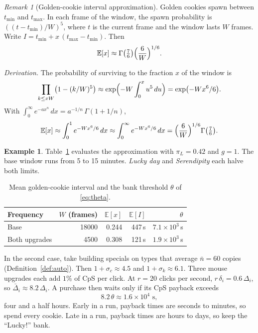 \documentclass[11pt,a4paper]{article}
\numberwithin{equation}{section}
\theoremstyle{definition}
\newtheorem{example}[theorem]{Example}
\theoremstyle{remark}
\newtheorem{remark}[theorem]{Remark}
\newcommand{\E}{\mathbb E}
\newcommand{\Lucky}{\textup{``Lucky!''}}
\begin{document}
\begin{remark}[Golden-cookie interval approximation]\label{lem:interval}
Golden cookies spawn between $t_{\min}$ and $t_{\max}$. In each frame of the window, the spawn probability is $((t-t_{\min})/W)^5$, where $t$ is the current frame and the window lasts $W$ frames. Write $I=t_{\min}+x\,(t_{\max}-t_{\min})$. Then
\begin{equation}\label{eq:interval}
 \E[x]\approx\Gamma\bigl(\tfrac76\bigr)\Bigl(\frac6W\Bigr)^{1/6}.
\end{equation}
\end{remark}

\noindent\emph{Derivation.}
The probability of surviving to the fraction $x$ of the window is
\[
 \prod_{k\le xW}\bigl(1-(k/W)^5\bigr)\approx\exp\Bigl(-W\int_0^xu^5\,du\Bigr)=\exp\bigl(-Wx^6/6\bigr).
\]
With $\int_0^\infty e^{-ax^n}\,dx=a^{-1/n}\,\Gamma(1+1/n)$,
\[
 \E[x]\approx\int_0^1e^{-Wx^6/6}\,dx\approx\int_0^\infty e^{-Wx^6/6}\,dx=\Bigl(\frac6W\Bigr)^{1/6}\Gamma\bigl(\tfrac76\bigr).
\]


\begin{example}\label{ex:theta}
Table~\ref{tab:interval} evaluates the approximation with $\pi_L=0.42$ and $g=1$. The base window runs from 5 to 15 minutes. \emph{Lucky day} and \emph{Serendipity} each halve both limits.

\begin{table}[H]
\centering
\small
\begin{tabular}{@{}lrrrr@{}}
\toprule
Frequency & $W$ (frames) & $\E[x]$ & $\E[I]$ & $\theta$ \\
\midrule
Base & 18000 & 0.244 & 447\,s & $7.1\times10^3$\,s \\
Both upgrades & 4500 & 0.308 & 121\,s & $1.9\times10^3$\,s \\
\bottomrule
\end{tabular}
\caption{Mean golden-cookie interval and the bank threshold $\theta$ of \eqref{eq:theta}.}
\label{tab:interval}
\end{table}

In the second case, take building specials on types that average $\bar n=60$ copies (Definition~\ref{def:auto}). Then $1+\sigma_c\approx4.5$ and $1+\sigma_k\approx6.1$. Three mouse upgrades each add $1\%$ of CpS per click. At $r=20$ clicks per second, $r\,\delta_i=0.6\,\Delta_i$, so $\bar\Delta_i\approx8.2\,\Delta_i$. A purchase then waits only if its CpS payback exceeds
\[
 8.2\,\theta\approx1.6\times10^4\text{ s},
\]
four and a half hours. Early in a run, payback times are seconds to minutes, so spend every cookie. Late in a run, payback times are hours to days, so keep the \Lucky{} bank.
\end{example}
\end{document}
